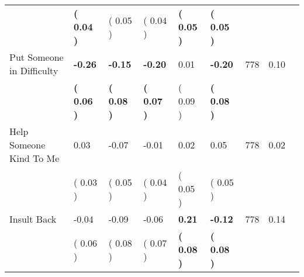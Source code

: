 \begin{tabular}{L{6.2cm} C{1.8cm} C{1.8cm} C{1.8cm} C{1.8cm} C{1.8cm} C{1.8cm} C{0.3cm} C{0.3cm}}
 & \textbf{(     0.04 )} & (     0.05 ) & (     0.04 ) & \textbf{(     0.05 )} & \textbf{(     0.05 )}  & \\
Put Someone in Difficulty & \textbf{    -0.26} & \textbf{    -0.15} & \textbf{    -0.20} &      0.01 & \textbf{    -0.20}  & 778 &       0.10 \\ 
 & \textbf{(     0.06 )} & \textbf{(     0.08 )} & \textbf{(     0.07 )} & (     0.09 ) & \textbf{(     0.08 )}  & \\
Help Someone Kind To Me &      0.03 &     -0.07 &     -0.01 &      0.02 &      0.05  & 778 &       0.02 \\ 
 & (     0.03 ) & (     0.05 ) & (     0.04 ) & (     0.05 ) & (     0.05 )  & \\
Insult Back &     -0.04 &     -0.09 &     -0.06 & \textbf{     0.21} & \textbf{    -0.12}  & 778 &       0.14 \\ 
 & (     0.06 ) & (     0.08 ) & (     0.07 ) & \textbf{(     0.08 )} & \textbf{(     0.08 )}  & \\
\bottomrule
\end{tabular}
